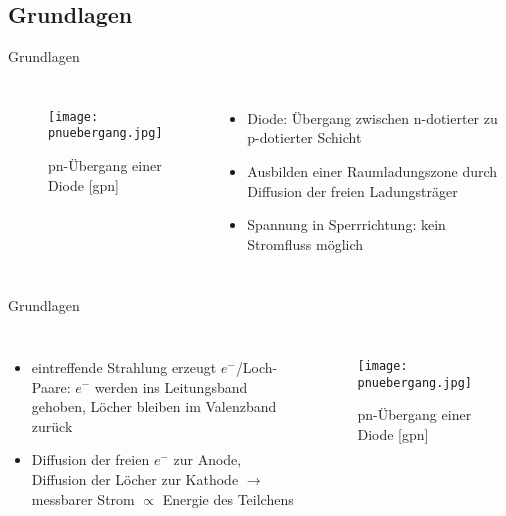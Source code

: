 \subsection[]{Grundlagen}

\begin{frame}{Grundlagen}
    \begin{columns}[T]
			\begin{figure}[htbp]
			  \centering
			  \texttt{[image: pnuebergang.jpg]}
			  \caption{pn-Übergang einer Diode [gpn]}
			\end{figure}
			
	    	\begin{itemize}
	    	  \item Diode: Übergang zwischen n-dotierter zu p-dotierter Schicht
			  \item Ausbilden einer Raumladungszone durch Diffusion der freien Ladungsträger
			  \item Spannung in Sperrrichtung: kein Stromfluss möglich
			\end{itemize}
    \end{columns}
\end{frame}


\begin{frame}{Grundlagen}
    \begin{columns}[T]	
	    	\begin{itemize}
	    	  \item eintreffende Strahlung erzeugt $e^-$/Loch-Paare: $e^-$ werden ins Leitungsband
	    	  gehoben, Löcher bleiben im Valenzband zurück
	    	  \item Diffusion der freien $e^-$ zur Anode, Diffusion der Löcher zur Kathode $\rightarrow$
	    	  messbarer Strom $\propto$ Energie des Teilchens
			\end{itemize}
			
			\begin{figure}[htbp]
			  \centering
			  \texttt{[image: pnuebergang.jpg]}
			  \caption{pn-Übergang einer Diode [gpn]}
			\end{figure}
    \end{columns}
\end{frame}